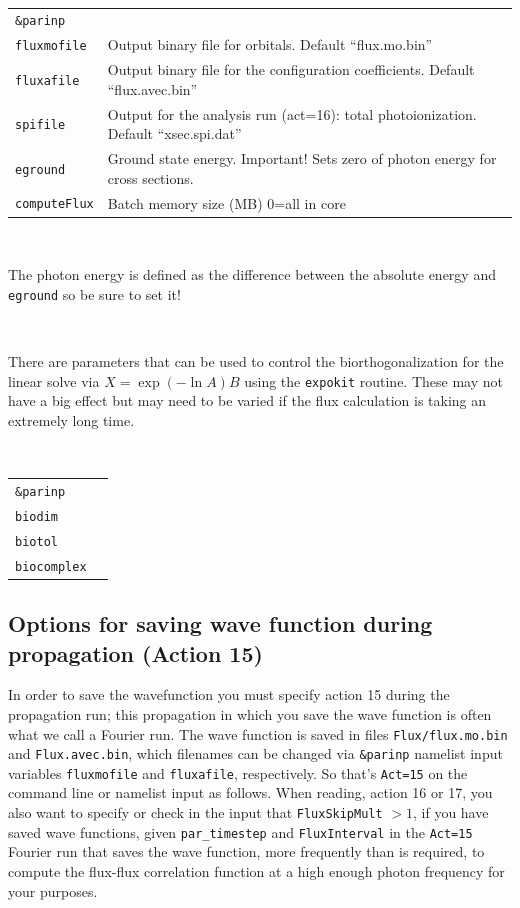 \documentclass[10pt,leqno, oneside]{book}
\begin{document}
\

{\footnotesize
\begin{tabular}{ll}
\verb#&parinp# \\
\verb#fluxmofile#  &  Output binary file for orbitals.  Default ``flux.mo.bin'' \\
\verb#fluxafile#  &  Output binary file for the configuration coefficients.  Default ``flux.avec.bin'' \\
\verb#spifile#  &  Output for the analysis run (act=16): total photoionization.  Default ``xsec.spi.dat'' \\
\verb#eground# & Ground state energy.  Important!  Sets zero of photon energy for cross sections. \\
\verb#computeFlux#  & Batch memory size (MB)  0=all in core\\
\end{tabular}}

\

The photon energy is defined as the difference between the absolute energy and \verb#eground# so be sure to set it!

\

There are parameters that can be used to control the biorthogonalization for the linear solve via $X=\exp ( -\ln A )B$ using the \verb#expokit# routine.
These may not have a big effect but may need to be varied if the flux calculation is taking an extremely long time. 

\

{\footnotesize
\begin{tabular}{ll}
\verb#&parinp# & \\
\verb#biodim# & \\
\verb#biotol# & \\
\verb#biocomplex# & \\
\end{tabular}}

\subsection{Options for saving wave function during propagation (Action 15) \label{act15sect}}

In order to save the wavefunction you must specify action 15 during the propagation run; this propagation in which 
you save the wave function is often
what we call a Fourier run.  The wave function is saved in files \verb#Flux/flux.mo.bin# and 
\verb#Flux.avec.bin#, which filenames can be changed via \verb#&parinp# namelist input variables \verb#fluxmofile# and \verb#fluxafile#, respectively.
%
So that's \verb#Act=15# on the command line
or namelist input as follows.  When reading, action 16 or 17, you also want to specify or check in the input that \verb#FluxSkipMult# $>1$, if you have saved 
wave functions, given \verb#par_timestep# and \verb#FluxInterval# in the \verb#Act=15# Fourier run that saves the wave function, more frequently
than is required, to compute the flux-flux correlation function at a high enough photon frequency for your purposes.
\end{document}
